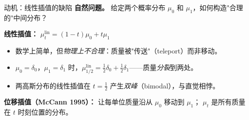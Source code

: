 
\begin{frame}{动机：线性插值的缺陷}
  \textbf{自然问题。} 给定两个概率分布 $\mu_{0}$ 和 $\mu_{1}$，如何构造"合理的"中间分布？

  \textbf{线性插值：} $\mu_{t}^{\mathrm{lin}}=(1-t)\mu_{0}+t\mu_{1}$
  \begin{itemize}
    \item 数学上简单，但\emph{物理上不合理}：质量被"传送"（teleport）而非移动。
    \item $\mu_{0}=\delta_{0}$，$\mu_{1}=\delta_{1}$ 时，$\mu_{1/2}^{\mathrm{lin}}=\tfrac{1}{2}\delta_{0}+\tfrac{1}{2}\delta_{1}$——质量\emph{分裂}到两处。
    \item 两高斯分布的线性插值在 $t=\tfrac{1}{2}$ 产生\emph{双峰}（bimodal），与直觉相悖。
  \end{itemize}

  \textbf{位移插值（McCann 1995）：} 让每单位质量沿从 $\mu_{0}$ 移动到 $\mu_{1}$；
  $\mu_{t}$ 是所有质量在 $t$ 时刻位置的分布。

\end{frame}

